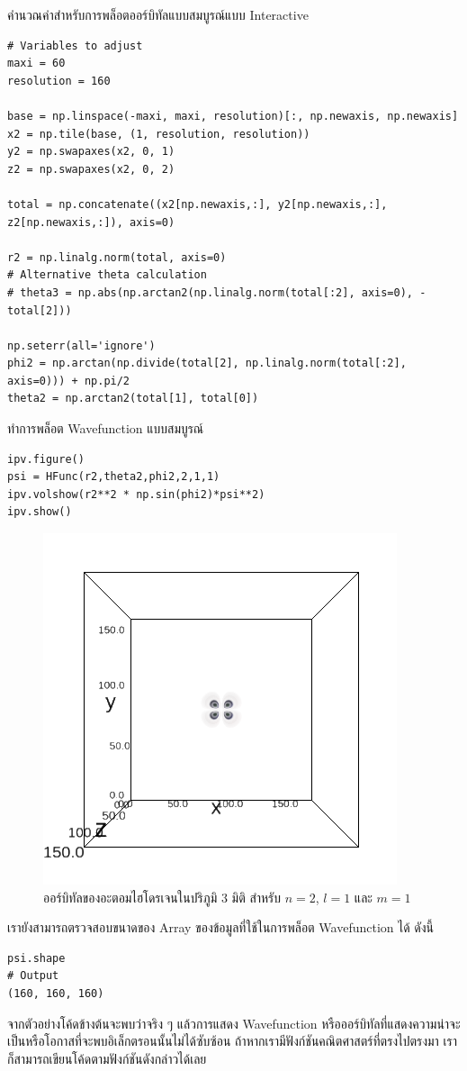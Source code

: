 \noindent คำนวณค่าสำหรับการพล็อตออร์บิทัลแบบสมบูรณ์แบบ Interactive

\begin{lstlisting}[style=MyPython]
# Variables to adjust
maxi = 60
resolution = 160

base = np.linspace(-maxi, maxi, resolution)[:, np.newaxis, np.newaxis]
x2 = np.tile(base, (1, resolution, resolution))
y2 = np.swapaxes(x2, 0, 1)
z2 = np.swapaxes(x2, 0, 2)

total = np.concatenate((x2[np.newaxis,:], y2[np.newaxis,:], z2[np.newaxis,:]), axis=0)

r2 = np.linalg.norm(total, axis=0)
# Alternative theta calculation
# theta3 = np.abs(np.arctan2(np.linalg.norm(total[:2], axis=0), -total[2]))

np.seterr(all='ignore')
phi2 = np.arctan(np.divide(total[2], np.linalg.norm(total[:2], axis=0))) + np.pi/2
theta2 = np.arctan2(total[1], total[0])
\end{lstlisting}

\noindent ทำการพล็อต Wavefunction แบบสมบูรณ์

\begin{lstlisting}[style=MyPython]
ipv.figure()
psi = HFunc(r2,theta2,phi2,2,1,1)
ipv.volshow(r2**2 * np.sin(phi2)*psi**2)
ipv.show()
\end{lstlisting}

\begin{figure}[H]
    \centering
    \includegraphics[width=0.8\linewidth]{fig/wfn_hydro_3d_n2_l1_m1.png}
    \caption{ออร์บิทัลของอะตอมไฮโดรเจนในปริภูมิ 3 มิติ สำหรับ $n = 2$, $l = 1$ และ $m = 1$}
    \label{fig:wfn_hydro_3d_n2_l1_m1}
\end{figure}

\noindent เรายังสามารถตรวจสอบขนาดของ Array ของข้อมูลที่ใช้ในการพล็อต Wavefunction ได้ ดังนี้

\begin{lstlisting}[style=MyPython]
psi.shape
# Output
(160, 160, 160)
\end{lstlisting}

\bigskip

จากตัวอย่างโค้ดข้างต้นจะพบว่าจริง ๆ แล้วการแสดง Wavefunction หรือออร์บิทัลที่แสดงความน่าจะเป็นหรือโอกาสที่จะพบอิเล็กตรอนนั้นไม่ได้ซับซ้อน 
ถ้าหากเรามีฟังก์ชันคณิตศาสตร์ที่ตรงไปตรงมา เราก็สามารถเขียนโค้ดตามฟังก์ชันดังกล่าวได้เลย
